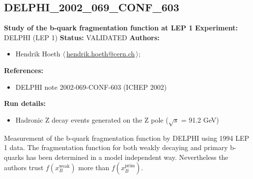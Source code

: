 \subsection{DELPHI\_2002\_069\_CONF\_603}
\textbf{Study of the b-quark fragmentation function at LEP 1}\newline
\textbf{Experiment:} DELPHI (LEP 1) \newline
\textbf{Status:} VALIDATED\newline
\textbf{Authors:}
\begin{itemize}
  \item Hendrik Hoeth $\langle\,$\href{mailto:hendrik.hoeth@cern.ch}{hendrik.hoeth@cern.ch}$\,\rangle$;
\end{itemize}
\textbf{References:}
\begin{itemize}
  \item DELPHI note 2002-069-CONF-603 (ICHEP 2002)
\end{itemize}
\textbf{Run details:}
\begin{itemize}

  \item Hadronic Z decay events generated on the Z pole (\ensuremath{\sqrt{s}} = 91.2 GeV)\end{itemize}

\noindent Measurement of the b-quark fragmentation function by DELPHI using 1994 LEP 1 data. The fragmentation function for both weakly decaying and primary b-quarks has been determined in a model independent way. Nevertheless the authors trust $f(x_B^\text{weak})$ more than $f(x_B^\text{prim})$.

\clearpage


\clearpage

